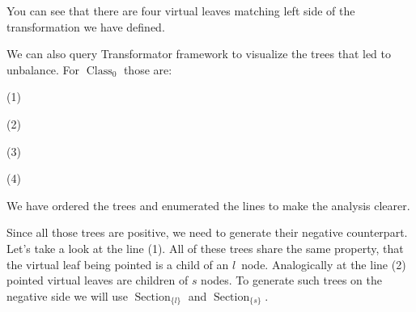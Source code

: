 \documentclass[final]{article}
\theoremstyle{definition}
\theoremstyle{definition}
\theoremstyle{remark}
\DeclareMathOperator{\tClass}{\text{Class}}
\DeclareMathOperator{\tSection}{\text{Section}}
\newcommand{\includeinlinescaledsvg}[3]{\begin{minipage}{#1\textwidth}\begin{center}\end{center}\end{minipage}}
\begin{document}
You can see that there are four virtual leaves matching left side of the transformation we have defined.

We can also query Transformator framework to visualize the trees that led to unbalance. For \(\tClass_0\) those are:

(1)%
\begin{minipage}{.98\textwidth}\begin{center}%
\includeinlinescaledsvg{.33}{.4}{lambda__trees_00__2}%
\includeinlinescaledsvg{.33}{.4}{lambda__trees_00__3}%
\includeinlinescaledsvg{.33}{.4}{lambda__trees_00__7}%
\end{center}\end{minipage}

(2)%
\begin{minipage}{.98\textwidth}\begin{center}%
\includeinlinescaledsvg{.33}{.4}{lambda__trees_00__4}%
\includeinlinescaledsvg{.33}{.4}{lambda__trees_00__12}%
\includeinlinescaledsvg{.33}{.4}{lambda__trees_00__13}%
\end{center}\end{minipage}

(3)%
\begin{minipage}{.98\textwidth}\begin{center}%
\includeinlinescaledsvg{.16}{.4}{lambda__trees_00__0}%
\includeinlinescaledsvg{.16}{.4}{lambda__trees_00__1}%
\includeinlinescaledsvg{.16}{.4}{lambda__trees_00__5}%
\includeinlinescaledsvg{.16}{.4}{lambda__trees_00__6}%
\includeinlinescaledsvg{.16}{.4}{lambda__trees_00__14}%
\includeinlinescaledsvg{.16}{.4}{lambda__trees_00__15}%
\end{center}\end{minipage}

(4)%
\begin{minipage}{.98\textwidth}\begin{center}%
\includeinlinescaledsvg{.25}{.4}{lambda__trees_00__8}%
\includeinlinescaledsvg{.25}{.4}{lambda__trees_00__9}%
\includeinlinescaledsvg{.25}{.4}{lambda__trees_00__10}%
\includeinlinescaledsvg{.25}{.4}{lambda__trees_00__11}%
\end{center}\end{minipage}

We have ordered the trees and enumerated the lines to make the analysis clearer.

Since all those trees are positive, we need to generate their negative counterpart. Let's take a look at the line (1). All of these trees share the same property, that the virtual leaf being pointed is a child of an \(l\)~node. Analogically at the line (2) pointed virtual leaves are children of \(s\) nodes. To generate such trees on the negative side we will use \(\tSection_{\{l\}}\) and \(\tSection_{\{s\}}\).
\end{document}
